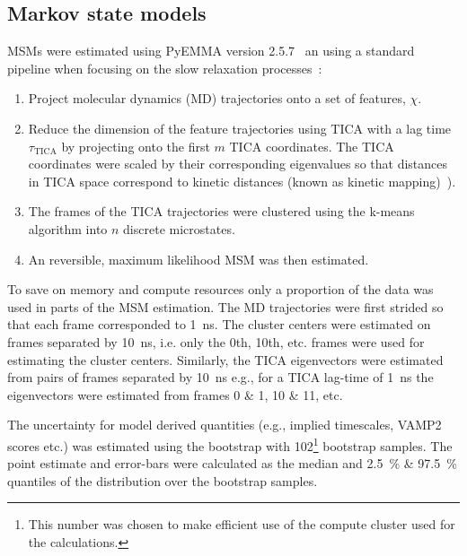 \documentclass[journal=jacsat,manuscript=article]{achemso}
\begin{document}
\subsection{Markov state models}
MSMs were estimated using PyEMMA version 2.5.7~\cite{schererPyEMMASoftwarePackage2015a} an using a standard pipeline when focusing on the slow relaxation processes~\cite{noe_markov_2019, husic_markov_2018}: 
\begin{enumerate}
    \item Project molecular dynamics (MD) trajectories onto a set of features, $\chi$. 
    \item Reduce the dimension of the feature trajectories using TICA with a lag time $\tau_{\mathrm{TICA}}$ by projecting onto the first $m$ TICA coordinates. The TICA coordinates were scaled by their corresponding eigenvalues so that distances in  TICA space correspond to kinetic distances (known as kinetic mapping)~\cite{noeKineticDistanceKinetic2015}).
    \item The frames of the TICA trajectories were clustered using the k-means algorithm into $n$ discrete microstates. 
    \item An reversible, maximum likelihood MSM was then estimated. 
\end{enumerate}
To save on memory and compute resources only a proportion of the data was used in parts of the MSM estimation. The MD trajectories were first strided so that each frame corresponded to \SI{1}{\nano\second}. The cluster centers were estimated on frames separated by \SI{10}{\nano\second}, i.e. only the 0th, 10th, etc. frames were used for estimating the cluster centers. Similarly, the TICA eigenvectors were estimated from pairs of frames separated by \SI{10}{\nano\second} e.g., for a TICA lag-time of \SI{1}{\nano\second} the eigenvectors were estimated from frames 0 \& 1, 10 \& 11, etc. 

The uncertainty for model derived quantities (e.g., implied timescales, VAMP2 scores etc.) was estimated using the bootstrap with \num{102}\footnote{This number was chosen to make efficient use of the compute cluster used for the calculations.} bootstrap samples. The point estimate and error-bars  were calculated as the median and  \SI{2.5}{\percent} \& \SI{97.5}{\percent} quantiles of the distribution over the bootstrap samples.
\end{document}
